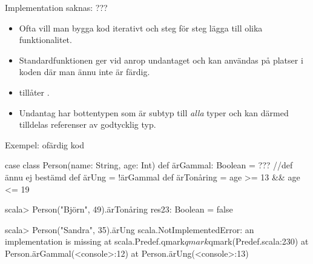 



\begin{Slide}{Implementation saknas: ???}
\begin{itemize}
\item Ofta vill man bygga kod iterativt och steg för steg lägga till olika funktionalitet.

\item Standardfunktionen  ger vid anrop undantaget  och kan användas på platser i koden där man ännu inte är färdig. 

\item {} tillåter .

\pause

\item Undantag har bottentypen  som är subtyp till \emph{alla} typer och kan därmed tilldelas referenser av godtycklig typ.


\end{itemize}
\end{Slide}

\begin{Slide}{Exempel: ofärdig kod}
\begin{Code}[basicstyle=\SlideFontSize{9}{11}\ttfamily\selectfont]
case class Person(name: String, age: Int){
  def ärGammal: Boolean = ???   //def ännu ej bestämd
  def ärUng = !ärGammal
  def ärTonåring = age >= 13 && age <= 19
}
\end{Code}
\begin{REPLnonum}
scala> Person("Björn", 49).ärTonåring
res23: Boolean = false

scala> Person("Sandra", 35).ärUng
scala.NotImplementedError: an implementation is missing
  at scala.Predef$.$qmark$qmark$qmark(Predef.scala:230)
  at Person.ärGammal(<console>:12)
  at Person.ärUng(<console>:13)
\end{REPLnonum}
\end{Slide}


